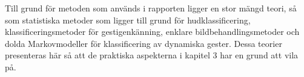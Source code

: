\documentclass[../rapport_MVEX01-11-05]{subfiles}
\begin{document}
Till grund för metoden som används i rapporten ligger en stor mängd teori, så som
statistiska metoder som ligger till grund för hudklassificering,
klassificeringsmetoder för gestigenkänning, enklare bildbehandlingsmetoder
och dolda Markovmodeller för klassificering av dynamiska gester. Dessa teorier
presenteras här så att de praktiska aspekterna i kapitel 3 har en grund att vila på.
\end{document}
